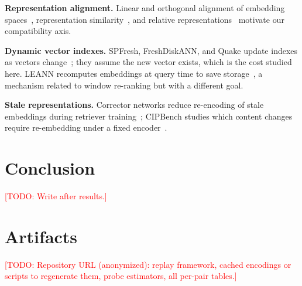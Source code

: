 \documentclass[conference]{IEEEtran}
\newcommand{\todo}[1]{\textcolor{red}{[TODO: #1]}}
\begin{document}
\textbf{Representation alignment.} Linear and orthogonal alignment of embedding
spaces~\cite{procrustes}, representation similarity~\cite{cka}, and relative
representations~\cite{relrep} motivate our compatibility axis.

\textbf{Dynamic vector indexes.} SPFresh, FreshDiskANN, and Quake update indexes as
vectors change~\cite{spfresh,freshdiskann,quake}; they assume the new vector exists,
which is the cost studied here. LEANN recomputes embeddings at query time to save
storage~\cite{leann}, a mechanism related to window re-ranking but with a different goal.

\textbf{Stale representations.} Corrector networks reduce re-encoding of stale
embeddings during retriever training~\cite{corrector}; CIPBench studies which content
changes require re-embedding under a fixed encoder~\cite{cipbench}.

\section{Conclusion}
\todo{Write after results.}

\section*{Artifacts}
\todo{Repository URL (anonymized): replay framework, cached encodings or scripts to
regenerate them, probe estimators, all per-pair tables.}
\end{document}
